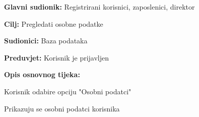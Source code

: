 			\noindent {}
			\begin{packed_item}
				
				\item \textbf{Glavni sudionik:} Registrirani korisnici, zaposlenici, direktor
				\item  \textbf{Cilj:} Pregledati osobne podatke
				\item  \textbf{Sudionici:} Baza podataka
				\item  \textbf{Preduvjet:} Korisnik je prijavljen
				\item  \textbf{Opis osnovnog tijeka:}
				
				\item[] \begin{packed_enum}
					
					\item Korisnik odabire opciju "Osobni podatci"
					\item Prikazuju se osobni podatci korisnika
					
				\end{packed_enum}
			\end{packed_item}
			
